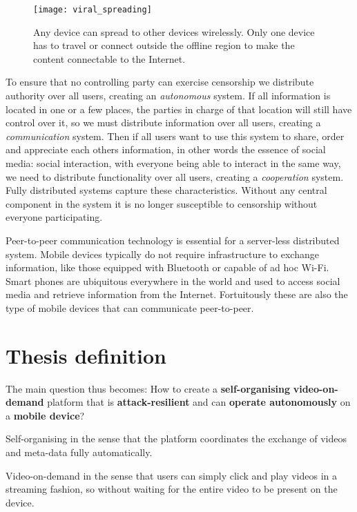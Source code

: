 \begin{figure}[h]
	\centering
	\texttt{[image: viral\_spreading]}
	\caption{Any device can spread to other devices wirelessly.
		Only one device has to travel or connect outside the offline region to make the content connectable to the Internet.}
	\label{fig:viral_spreading}
\end{figure}



To ensure that no controlling party can exercise censorship we distribute authority over all users, creating an \emph{autonomous} system.
If all information is located in one or a few places, the parties in charge of that location will still have control over it, so we must distribute information over all users, creating a \emph{communication} system.
Then if all users want to use this system to share, order and appreciate each others information, in other words the essence of social media: social interaction, with everyone being able to interact in the same way, we need to  distribute functionality over all users, creating a \emph{cooperation} system.
Fully distributed systems capture these characteristics. %
Without any central component in the system it is no longer susceptible to censorship without everyone participating.

Peer-to-peer communication technology is essential for a server-less distributed system.
Mobile devices typically do not require infrastructure to exchange information, like those equipped with Bluetooth or capable of ad hoc Wi-Fi.
Smart phones are ubiquitous everywhere in the world and used to access social media and retrieve information from the Internet.
Fortuitously these are also the type of mobile devices that can communicate peer-to-peer.

\section{Thesis definition}
The main question thus becomes:
How to create a \textbf{self-organising} \textbf{video-on-demand} platform that is \textbf{attack-resilient} and can \textbf{operate autonomously} on a \textbf{mobile device}?

Self-organising in the sense that the platform coordinates the exchange of videos and meta-data fully automatically.

Video-on-demand in the sense that users can simply click and play videos in a streaming fashion, so without waiting for the entire video to be present on the device.

